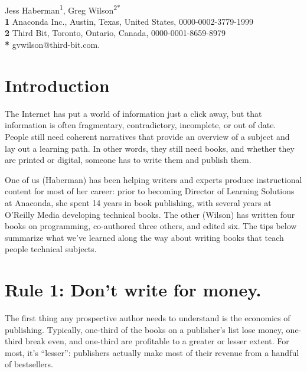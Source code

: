 \documentclass[10pt,letterpaper]{article}
\begin{document}
\vspace*{0.2in}

\begin{flushleft}
{\Large
\textbf{}
}
\newline
\\
{Jess Haberman}\textsuperscript{1},
{Greg Wilson}\textsuperscript{2*}
\\
\bigskip
\textbf{1} Anaconda Inc., Austin, Texas, United States, 0000-0002-3779-1999\\
\textbf{2} Third Bit, Toronto, Ontario, Canada, 0000-0001-8659-8979\\
\textbf{*} gvwilson@third-bit.com.
\end{flushleft}

\section*{Introduction}

The Internet has put a world of information just a click away, but that
information is often fragmentary, contradictory, incomplete, or out of
date. People still need coherent narratives that provide an overview of
a subject and lay out a learning path. In other words, they still need
books, and whether they are printed or digital, someone has to write
them and publish them.

One of us (Haberman) has been helping writers and experts produce
instructional content for most of her career: prior to becoming Director
of Learning Solutions at Anaconda, she spent 14 years in book
publishing, with several years at O'Reilly Media developing technical
books. The other (Wilson) has written four books on
programming, co-authored three others, and edited six. The tips below
summarize what we've learned along the way about writing books that
teach people technical subjects.

\section*{Rule 1: Don't write for money.}

The first thing any prospective author needs to understand is the
economics of publishing. Typically, one-third of the books on a
publisher's list lose money, one-third break even, and one-third are
profitable to a greater or lesser extent. For most, it's ``lesser'':
publishers actually make most of their revenue from a handful of
bestsellers.
\end{document}
